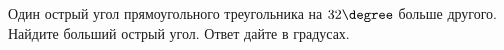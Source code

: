 \begin{ex}
	\begin{condition}
		 Один острый угол прямоугольного треугольника на \( 32\degree \) больше другого. Найдите больший острый угол. Ответ дайте в градусах.
	\end{condition}
\end{ex}